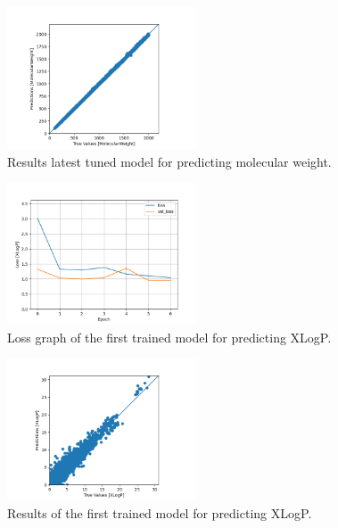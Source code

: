     \begin{figure}
        \centering
        \includegraphics[width=0.5\textwidth]{model_23_7_epochs_predictions_MolecularWeight.png}
        \caption{Results latest tuned model for predicting molecular weight.}
        \label{fig:model23-mol-weight-predictions}
    \end{figure}
    \begin{figure}
        \centering
        \includegraphics[width=0.5\textwidth]{model_7_7_epochs_loss_XLogP.png}
        \caption{Loss graph of the first trained model for predicting XLogP.}
        \label{fig:model7-xlogp-loss}
    \end{figure}
    \begin{figure}
        \centering
        \includegraphics[width=0.5\textwidth]{model_7_7_epochs_predictions_XLogP.png}
        \caption{Results of the first trained model for predicting XLogP.}
        \label{fig:model7-xlogp-predictions}
    \end{figure}